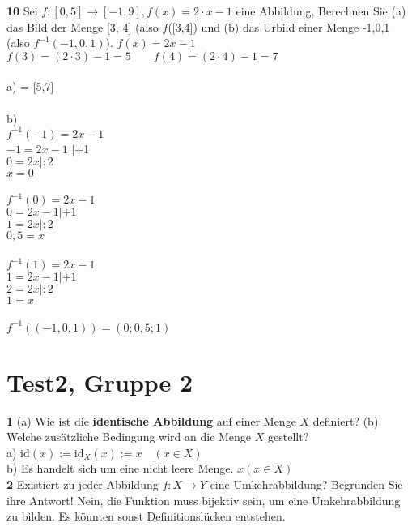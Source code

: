 \documentclass[11pt]{article}
\begin{document}
    \textbf{10} Sei $f : [0,5] \rightarrow [-1,9], f(x) = 2 \cdot x - 1$ eine Abbildung, Berechnen Sie (a) das Bild der Menge [3, 4] (also $f$([3,4]) und (b) das Urbild einer Menge {-1,0,1} (also $f^{-1}({-1,0,1})$).\newline\newline
    $f(x) = 2x - 1$ \\
    $f(3) = (2 \cdot 3) - 1 = 5 \quad \quad f(4) = (2 \cdot 4) - 1 = 7$ \\\\
    a)  = [5,7]\\\\
    b)\\$ f^{-1}(-1) = 2x-1$ \\ $ -1 = 2x - 1$ $|$+1\\$ 0 = 2x |:2$\\$x = 0$\\\\
    $ f^{-1}(0) = 2x-1$ \\ $ 0 = 2x - 1 |+1$\\ $ 1 = 2x |:2$\\$ 0,5 = x$\\\\
    $ f^{-1}(1) = 2x-1$ \\ $ 1 = 2x - 1 |+1$\\ $ 2 = 2x |:2$\\$1 = x$\\\\
    $f^{-1}((-1,0,1)) = (0;0,5;1)$

    \section{Test2, Gruppe 2}

    \textbf{1} (a) Wie ist die \textbf{identische Abbildung} auf einer Menge $X$ definiert? (b) Welche zusätzliche Bedingung wird an die Menge $X$ gestellt?\\
    a) $\text{id}(x) := \text{id}_X(x) := x \quad (x \in X)$\\
    b) Es handelt sich um eine nicht leere Menge. $x(x \in X)$\\

    \textbf{2} Existiert zu jeder Abbildung $f : X \rightarrow Y $ eine Umkehrabbildung? Begründen Sie ihre Antwort!\newline
    Nein, die Funktion muss bijektiv sein, um eine Umkehrabbildung zu bilden. Es könnten sonst Definitionslücken entstehen.\newline
\end{document}
